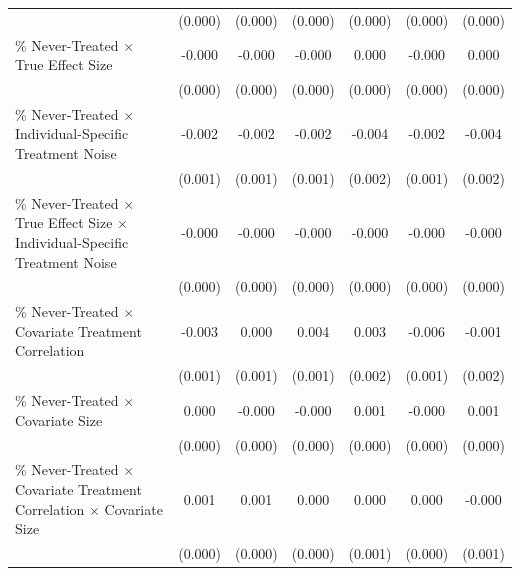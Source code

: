 \documentclass[12pt]{article}
\begin{document}
\begin{table}[htbp]
{\begin{tabular}{p{4.5in}|*{6}{c}}
                    &     (0.000)         &     (0.000)         &     (0.000)         &     (0.000)         &     (0.000)         &     (0.000)         \\
\% Never-Treated $\times$ True Effect Size&      -0.000         &      -0.000         &      -0.000         &       0.000         &      -0.000         &       0.000         \\
                    &     (0.000)         &     (0.000)         &     (0.000)         &     (0.000)         &     (0.000)         &     (0.000)         \\
\% Never-Treated $\times$ Individual-Specific Treatment Noise&      -0.002\sym{***}&      -0.002\sym{***}&      -0.002\sym{*}  &      -0.004\sym{**} &      -0.002\sym{**} &      -0.004\sym{**} \\
                    &     (0.001)         &     (0.001)         &     (0.001)         &     (0.002)         &     (0.001)         &     (0.002)         \\
\% Never-Treated $\times$ True Effect Size $\times$ Individual-Specific Treatment Noise&      -0.000\sym{*}  &      -0.000\sym{*}  &      -0.000         &      -0.000         &      -0.000         &      -0.000         \\
                    &     (0.000)         &     (0.000)         &     (0.000)         &     (0.000)         &     (0.000)         &     (0.000)         \\
\% Never-Treated $\times$ Covariate Treatment Correlation&      -0.003\sym{**} &       0.000         &       0.004\sym{***}&       0.003         &      -0.006\sym{***}&      -0.001         \\
                    &     (0.001)         &     (0.001)         &     (0.001)         &     (0.002)         &     (0.001)         &     (0.002)         \\
\% Never-Treated $\times$ Covariate Size&       0.000         &      -0.000         &      -0.000         &       0.001\sym{***}&      -0.000         &       0.001\sym{**} \\
                    &     (0.000)         &     (0.000)         &     (0.000)         &     (0.000)         &     (0.000)         &     (0.000)         \\
\% Never-Treated $\times$ Covariate Treatment Correlation $\times$ Covariate Size&       0.001         &       0.001         &       0.000         &       0.000         &       0.000         &      -0.000         \\
                    &     (0.000)         &     (0.000)         &     (0.000)         &     (0.001)         &     (0.000)         &     (0.001)         \\

\end{tabular}}
\end{table}
\end{document}

